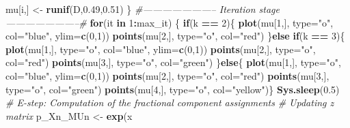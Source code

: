 \documentclass[]{article}
\newenvironment{Shaded}{\begin{snugshade}}{\end{snugshade}}
\newcommand{\KeywordTok}[1]{\textcolor[rgb]{0.13,0.29,0.53}{\textbf{#1}}}
\newcommand{\DataTypeTok}[1]{\textcolor[rgb]{0.13,0.29,0.53}{#1}}
\newcommand{\DecValTok}[1]{\textcolor[rgb]{0.00,0.00,0.81}{#1}}
\newcommand{\FloatTok}[1]{\textcolor[rgb]{0.00,0.00,0.81}{#1}}
\newcommand{\StringTok}[1]{\textcolor[rgb]{0.31,0.60,0.02}{#1}}
\newcommand{\CommentTok}[1]{\textcolor[rgb]{0.56,0.35,0.01}{\textit{#1}}}
\newcommand{\ControlFlowTok}[1]{\textcolor[rgb]{0.13,0.29,0.53}{\textbf{#1}}}
\newcommand{\OperatorTok}[1]{\textcolor[rgb]{0.81,0.36,0.00}{\textbf{#1}}}
\newcommand{\NormalTok}[1]{#1}
\begin{document}
\begin{Shaded}
\begin{Highlighting}[]
\NormalTok{mu[i,] <-}\StringTok{ }\KeywordTok{runif}\NormalTok{(D,}\FloatTok{0.49}\NormalTok{,}\FloatTok{0.51}\NormalTok{)}
\NormalTok{\}}
\CommentTok{#----------------------- Iteration stage -----------------------#}
\ControlFlowTok{for}\NormalTok{(it }\ControlFlowTok{in} \DecValTok{1}\OperatorTok{:}\NormalTok{max_it) \{}
\ControlFlowTok{if}\NormalTok{(k }\OperatorTok{==}\StringTok{ }\DecValTok{2}\NormalTok{)\{}
\KeywordTok{plot}\NormalTok{(mu[}\DecValTok{1}\NormalTok{,], }\DataTypeTok{type=}\StringTok{"o"}\NormalTok{, }\DataTypeTok{col=}\StringTok{"blue"}\NormalTok{, }\DataTypeTok{ylim=}\KeywordTok{c}\NormalTok{(}\DecValTok{0}\NormalTok{,}\DecValTok{1}\NormalTok{))}
\KeywordTok{points}\NormalTok{(mu[}\DecValTok{2}\NormalTok{,], }\DataTypeTok{type=}\StringTok{"o"}\NormalTok{, }\DataTypeTok{col=}\StringTok{"red"}\NormalTok{)}
\NormalTok{\}}\ControlFlowTok{else} \ControlFlowTok{if}\NormalTok{(k }\OperatorTok{==}\StringTok{ }\DecValTok{3}\NormalTok{)\{}
\KeywordTok{plot}\NormalTok{(mu[}\DecValTok{1}\NormalTok{,], }\DataTypeTok{type=}\StringTok{"o"}\NormalTok{, }\DataTypeTok{col=}\StringTok{"blue"}\NormalTok{, }\DataTypeTok{ylim=}\KeywordTok{c}\NormalTok{(}\DecValTok{0}\NormalTok{,}\DecValTok{1}\NormalTok{))}
\KeywordTok{points}\NormalTok{(mu[}\DecValTok{2}\NormalTok{,], }\DataTypeTok{type=}\StringTok{"o"}\NormalTok{, }\DataTypeTok{col=}\StringTok{"red"}\NormalTok{)}
\KeywordTok{points}\NormalTok{(mu[}\DecValTok{3}\NormalTok{,], }\DataTypeTok{type=}\StringTok{"o"}\NormalTok{, }\DataTypeTok{col=}\StringTok{"green"}\NormalTok{)}
\NormalTok{\}}\ControlFlowTok{else}\NormalTok{\{}
\KeywordTok{plot}\NormalTok{(mu[}\DecValTok{1}\NormalTok{,], }\DataTypeTok{type=}\StringTok{"o"}\NormalTok{, }\DataTypeTok{col=}\StringTok{"blue"}\NormalTok{, }\DataTypeTok{ylim=}\KeywordTok{c}\NormalTok{(}\DecValTok{0}\NormalTok{,}\DecValTok{1}\NormalTok{))}
\KeywordTok{points}\NormalTok{(mu[}\DecValTok{2}\NormalTok{,], }\DataTypeTok{type=}\StringTok{"o"}\NormalTok{, }\DataTypeTok{col=}\StringTok{"red"}\NormalTok{)}
\KeywordTok{points}\NormalTok{(mu[}\DecValTok{3}\NormalTok{,], }\DataTypeTok{type=}\StringTok{"o"}\NormalTok{, }\DataTypeTok{col=}\StringTok{"green"}\NormalTok{)}
\KeywordTok{points}\NormalTok{(mu[}\DecValTok{4}\NormalTok{,], }\DataTypeTok{type=}\StringTok{"o"}\NormalTok{, }\DataTypeTok{col=}\StringTok{"yellow"}\NormalTok{)\}}
\KeywordTok{Sys.sleep}\NormalTok{(}\FloatTok{0.5}\NormalTok{)}
\CommentTok{# E-step: Computation of the fractional component assignments}
\CommentTok{# Updating z matrix}
\NormalTok{p_Xn_MUn <-}\StringTok{ }\KeywordTok{exp}\NormalTok{(x }\OperatorTok{%*%}\StringTok{ }\KeywordTok{log}\NormalTok{(}\KeywordTok{t}\NormalTok{(mu)) }\OperatorTok{+}\StringTok{ }\NormalTok{(}\DecValTok{1} \OperatorTok{-}\StringTok{ }\NormalTok{x) }\OperatorTok{%*%}\StringTok{ }\KeywordTok{log}\NormalTok{(}\DecValTok{1} \OperatorTok{-}\StringTok{ }\KeywordTok{t}\NormalTok{(mu)))}
}
\end{Highlighting}
\end{Shaded}
\end{document}
